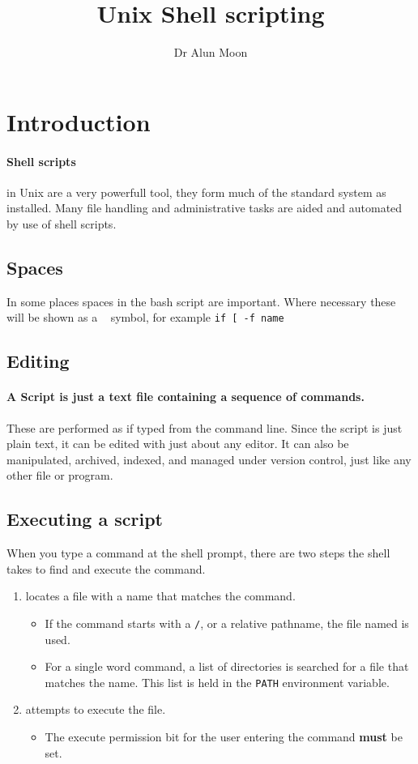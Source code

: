 \documentclass{article}
\title{Unix Shell scripting}
\author{Dr Alun Moon}
\begin{document}
\maketitle
\section{Introduction}
\paragraph{Shell scripts} in Unix are a very powerfull tool, they
form much of the standard system as installed.  Many file handling and
administrative tasks are aided and automated by use of shell scripts.

\subsection{Spaces}
In some places spaces in the bash script are important.  Where
necessary these will be shown as a \verb*| | symbol, for example
\verb*'if [ -f name'

\subsection{Editing}
\paragraph{A Script is just a text file containing a sequence of
  commands.}  These are performed as if typed from the command line.
Since the script is just plain text, it can be edited with just about any
editor.  It can also be manipulated, archived, indexed, and managed under
version control,  just like any other file or program.

\subsection{Executing a script}
When you type a command at the shell prompt, there are two steps the shell
takes to find and execute the command.
\begin{enumerate}
	\item locates a file with a name that matches the command.
		\begin{itemize}
			\item If the command starts with a \verb'/', or a relative
				pathname, the file named is used.
			\item For a single word command, a list of directories is searched
				for a file that matches the name.  This list is held in the
				\verb'PATH' environment variable.
		\end{itemize}
	\item attempts to execute the file.
		\begin{itemize}
			\item The execute permission bit for the user entering the command
				\textbf{must} be set.
		\end{itemize}
\end{enumerate}
\end{document}
